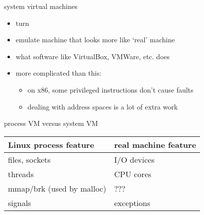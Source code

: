 
\begin{frame}{system virtual machines}
\begin{itemize}
    \item turn 
    \item emulate machine that looks more like `real' machine
    \vspace{.5cm}
    \item what software like VirtualBox, VMWare, etc. does
    \item more complicated than this:
        \begin{itemize}
        \item on x86, some privileged instructions don't cause faults
        \item dealing with address spaces is a lot of extra work
        \end{itemize}
\end{itemize}
\end{frame}

\begin{frame}{process VM versus system VM}
\begin{tabular}{l|l}
Linux process feature & real machine feature \\\hline
files, sockets & I/O devices \\
threads & CPU cores \\
mmap/brk (used by malloc) & ??? \\
signals & exceptions \\
\end{tabular}
\end{frame}

